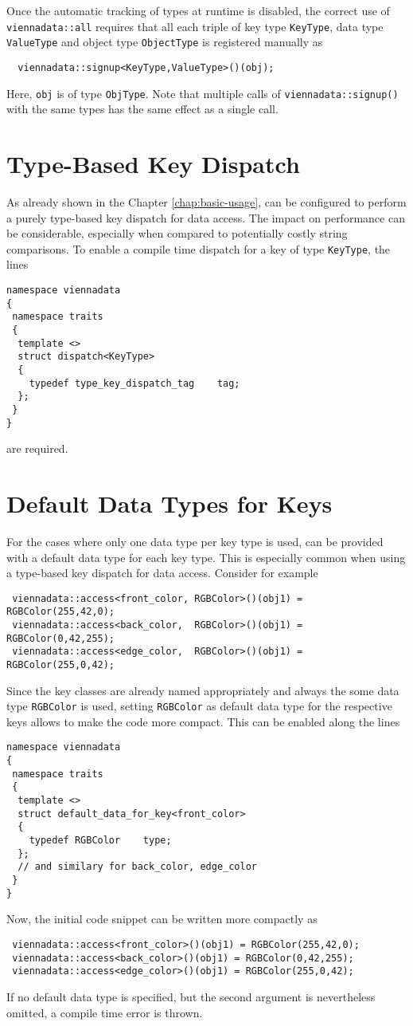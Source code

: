 Once the automatic tracking of types at runtime is disabled, the correct use of \lstinline|viennadata::all| requires that all each triple of key type \lstinline|KeyType|, data type \lstinline|ValueType| and object type \lstinline|ObjectType| is registered manually as
\begin{lstlisting}
  viennadata::signup<KeyType,ValueType>()(obj);
\end{lstlisting}
Here, \lstinline|obj| is of type \lstinline|ObjType|. Note that multiple calls of \lstinline|viennadata::signup()| with the same types has the same effect as a single call.

\section{Type-Based Key Dispatch} \label{sec:compiletime-keys}
As already shown in the Chapter \ref{chap:basic-usage}, {\ViennaData} can be configured to perform a purely type-based key dispatch for data access.
The impact on performance can be considerable, especially when compared to potentially costly string comparisons.
To enable a compile time dispatch for a key of type \lstinline|KeyType|, the lines
\begin{lstlisting}
namespace viennadata
{
 namespace traits
 {
  template <>
  struct dispatch<KeyType>
  {
    typedef type_key_dispatch_tag    tag;
  };
 }
} 
\end{lstlisting}
are required.

\section{Default Data Types for Keys} \label{sec:default-valuetype}
For the cases where only one data type per key type is used, {\ViennaData} can be provided with a default data type for each key type.
This is especially common when using a type-based key dispatch for data access. Consider for example
\begin{lstlisting}
 viennadata::access<front_color, RGBColor>()(obj1) = RGBColor(255,42,0);
 viennadata::access<back_color,  RGBColor>()(obj1) = RGBColor(0,42,255);
 viennadata::access<edge_color,  RGBColor>()(obj1) = RGBColor(255,0,42);
\end{lstlisting}
Since the key classes are already named appropriately and always the some data type \lstinline|RGBColor| is used, 
setting \lstinline|RGBColor| as default data type for the respective keys allows to make the code more compact.
This can be enabled along the lines
\begin{lstlisting}
namespace viennadata
{
 namespace traits
 {
  template <>
  struct default_data_for_key<front_color>
  {
    typedef RGBColor    type;
  };
  // and similary for back_color, edge_color
 }
} 
\end{lstlisting}
Now, the initial code snippet can be written more compactly as
\begin{lstlisting}
 viennadata::access<front_color>()(obj1) = RGBColor(255,42,0);
 viennadata::access<back_color>()(obj1) = RGBColor(0,42,255);
 viennadata::access<edge_color>()(obj1) = RGBColor(255,0,42);
\end{lstlisting}
If no default data type is specified, but the second argument is nevertheless omitted, a compile time error is thrown.